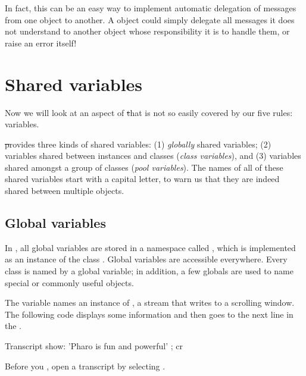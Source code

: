 \documentclass[a4paper,10pt,twoside]{book}
\begin{document}
In fact, this can be an easy way to implement automatic delegation of messages from one object to another.
A  object could simply delegate all messages it does not understand to another object whose responsibility it is to handle them, or raise an error itself!

\section{Shared variables}

Now we will look at an aspect of \st that is not so easily covered by our five rules:  variables.

\st provides three kinds of shared variables: (1) \emph{globally} shared variables; (2) variables shared between instances and classes (\emph{class variables}), and (3) variables shared amongst a group of  classes (\emph{pool variables}).  The names of all of these shared variables start with a capital letter, to warn us that they are indeed shared between multiple objects.

\subsection{Global variables}
In \pharo, all global variables are stored in a namespace called , which is implemented as an instance of the class .
Global variables are accessible everywhere. 
Every class is named by a global variable; in addition, a few globals are used to name special or commonly useful objects.

The variable  names an instance of , a stream that writes to a scrolling window.
The following code displays some information and then goes to the next line in the .

\begin{code}{}
Transcript show: 'Pharo is fun and powerful' ; cr
\end{code}

\noindent
Before you , open a transcript by selecting .

\end{document}
